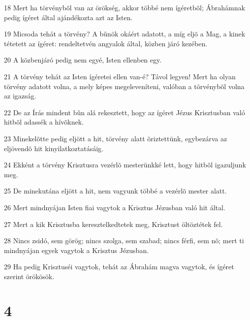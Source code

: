 \par 18 Mert ha törvénybõl van az örökség, akkor többé nem ígéretbõl; Ábrahámnak pedig ígéret által ajándékozta azt az Isten.
\par 19 Micsoda tehát a törvény? A bûnök okáért adatott, a míg eljõ a Mag, a kinek tétetett az ígéret: rendeltetvén angyalok által, közben járó kezében.
\par 20 A közbenjáró pedig nem egyé, Isten ellenben egy.
\par 21 A törvény tehát az Isten ígéretei ellen van-é? Távol legyen! Mert ha olyan törvény adatott volna, a mely képes megeleveníteni, valóban a törvénybõl volna az igazság.
\par 22 De az Írás mindent bûn alá rekesztett, hogy az ígéret Jézus Krisztusban való hitbõl adassék a hívõknek.
\par 23 Minekelõtte pedig eljött a hit, törvény alatt õriztettünk, egybezárva az eljövendõ hit kinyilatkoztatásáig.
\par 24 Ekként a törvény Krisztusra vezérlõ mesterünkké lett, hogy hitbõl igazuljunk meg.
\par 25 De minekutána eljött a hit, nem vagyunk többé a vezérlõ mester alatt.
\par 26 Mert mindnyájan Isten fiai vagytok a Krisztus Jézusban való hit által.
\par 27 Mert a kik Krisztusba keresztelkedtetek meg, Krisztust öltöztétek fel.
\par 28 Nincs zsidó, sem görög; nincs szolga, sem szabad; nincs férfi, sem nõ; mert ti mindnyájan egyek vagytok a Krisztus Jézusban.
\par 29 Ha pedig Krisztuséi vagytok, tehát az Ábrahám magva vagytok, és ígéret szerint örökösök.

\chapter{4}

